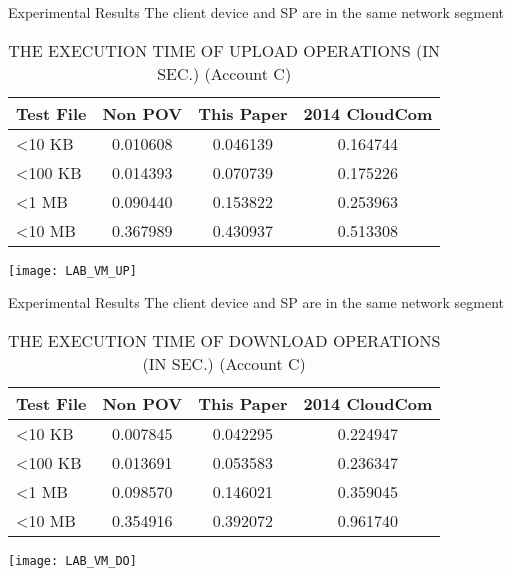 \begin{frame}{Experimental Results}
{The client device and SP are in the same network segment}
	\scriptsize
    \begin{table}[]
    \centering
    \caption{THE EXECUTION TIME OF \alert{UPLOAD} OPERATIONS (IN SEC.) (Account C)}
    \begin{tabular}{lccc}
        Test File        & Non POV  & This Paper & 2014 CloudCom \\ \hline
        \textless 10 KB  & 0.010608 & 0.046139   & 0.164744      \\ \hline
        \textless 100 KB & 0.014393 & 0.070739   & 0.175226      \\ \hline
        \textless 1 MB   & 0.090440 & 0.153822   & 0.253963      \\ \hline
        \textless 10 MB  & 0.367989 & 0.430937   & 0.513308      \\ \hline
    \end{tabular}
    \end{table}
    \begin{center}
		\texttt{[image: LAB\_VM\_UP]}
    \end{center}
\end{frame}

\begin{frame}{Experimental Results}
{The client device and SP are in the same network segment}
	\scriptsize
    \begin{table}[] 
    \centering
    \caption{THE EXECUTION TIME OF \alert{DOWNLOAD} OPERATIONS (IN SEC.) (Account C)}
    \begin{tabular}{lccc}
        Test File        & Non POV  & This Paper & 2014 CloudCom \\ \hline
        \textless 10 KB  & 0.007845 & 0.042295   & 0.224947      \\ \hline
        \textless 100 KB & 0.013691 & 0.053583   & 0.236347      \\ \hline
        \textless 1 MB   & 0.098570 & 0.146021   & 0.359045      \\ \hline
        \textless 10 MB  & 0.354916 & 0.392072   & 0.961740      \\ \hline
    \end{tabular}
    \end{table}
    \begin{center}
	    \texttt{[image: LAB\_VM\_DO]}
    \end{center}
\end{frame}

